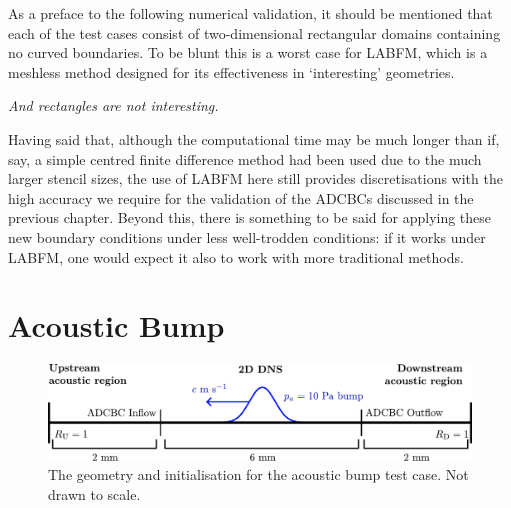 As a preface to the following numerical validation, it should be mentioned that each of the test cases consist of two-dimensional rectangular domains containing no curved boundaries. To be blunt this is a worst case for LABFM, which is a meshless method designed for its effectiveness in `interesting' geometries.

\emph{And rectangles are not interesting.}

Having said that, although the computational time may be much longer than if, say, a simple centred finite difference method had been used due to the much larger stencil sizes, the use of LABFM here still provides discretisations with the high accuracy we require for the validation of the ADCBCs discussed in the previous chapter. Beyond this, there is something to be said for applying these new boundary conditions under less well-trodden conditions: if it works under LABFM, one would expect it also to work with more traditional methods.





\section{Acoustic Bump}

\begin{figure}[t]
\centering
\includegraphics[scale=0.60]{assets/imgs/adcbc_bump_test.pdf}
\caption{The geometry and initialisation for the acoustic bump test case. Not drawn to scale.}
\label{fig:ac-bump-test}
\end{figure}

